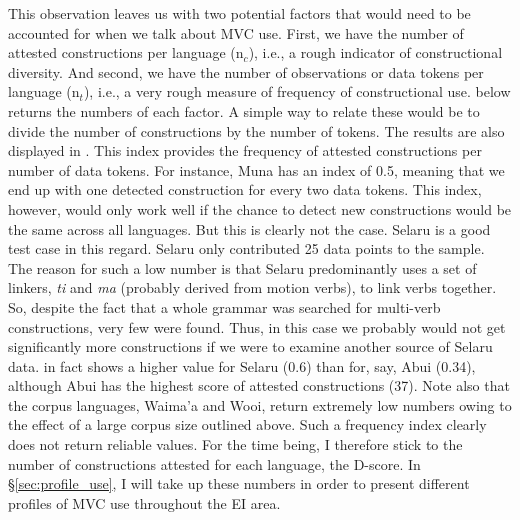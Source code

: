 This observation leaves us with two potential factors that would need to be accounted for when we talk about MVC use. First, we have the number of attested constructions per language (n$_c$), i.e., a rough indicator of constructional diversity. And second, we have the number of observations or data tokens per language (n$_t$), i.e., a very rough measure of frequency of constructional use.  below returns the numbers of each factor. A simple way to relate these would be to divide the number of constructions by the number of tokens. The results are also displayed in . This index provides the frequency of attested constructions per number of data tokens. For instance, Muna has an index of 0.5, meaning that we end up with one detected construction for every two data tokens. This index, however, would only work well if the chance to detect new constructions would be the same across all languages. But this is clearly not the case. Selaru is a good test case in this regard. Selaru only contributed 25 data points to the sample. The reason for such a low number is that Selaru predominantly uses a set of linkers, \textit{ti} and \textit{ma} (probably derived from motion verbs), to link verbs together. So, despite the fact that a whole grammar was searched for multi-verb constructions, very few were found. Thus, in this case we probably would not get significantly more constructions if we were to examine another source of Selaru data.  in fact shows a higher value for Selaru (0.6) than for, say, Abui (0.34), although Abui has the highest score of attested constructions (37). Note also that the corpus languages, Waima'a and Wooi, return extremely low numbers owing to the effect of a large corpus size outlined above. Such a frequency index clearly does not return reliable values. For the time being, I therefore stick to the number of constructions attested for each language, the D-score. In §\ref{sec:profile_use}, I will take up these numbers in order to present different profiles of MVC use throughout the EI area.


